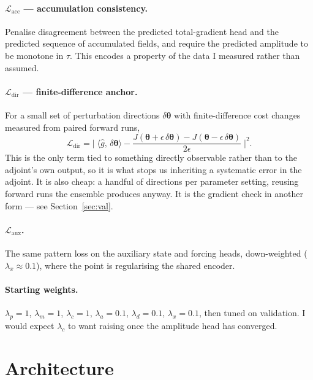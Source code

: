 \paragraph{$\mathcal{L}_{\text{acc}}$ --- accumulation consistency.}
Penalise disagreement between the predicted total-gradient head and the
predicted sequence of accumulated fields, and require the predicted amplitude
to be monotone in $\tau$. This encodes a property of the data I measured rather
than assumed.

\paragraph{$\mathcal{L}_{\text{dir}}$ --- finite-difference anchor.}
For a small set of perturbation directions $\delta\boldsymbol{\theta}$ with
finite-difference cost changes measured from paired forward runs,
\begin{equation}
\mathcal{L}_{\text{dir}}
= \Big|\;\langle \hat{g},\,\delta\boldsymbol{\theta}\rangle
  - \frac{J(\boldsymbol{\theta}+\epsilon\,\delta\boldsymbol{\theta})
        - J(\boldsymbol{\theta}-\epsilon\,\delta\boldsymbol{\theta})}
         {2\epsilon}\;\Big|^{2}.
\end{equation}
This is the only term tied to something directly observable rather than to the
adjoint's own output, so it is what stops us inheriting a systematic error in
the adjoint. It is also cheap: a handful of directions per parameter setting,
reusing forward runs the ensemble produces anyway. It is the gradient check in
another form --- see Section~\ref{sec:val}.

\paragraph{$\mathcal{L}_{\text{aux}}$.} The same pattern loss on the auxiliary
state and forcing heads, down-weighted ($\lambda_{x}\approx0.1$), where the
point is regularising the shared encoder.

\paragraph{Starting weights.}
$\lambda_{p}=1$, $\lambda_{m}=1$, $\lambda_{c}=1$, $\lambda_{a}=0.1$,
$\lambda_{d}=0.1$, $\lambda_{x}=0.1$, then tuned on validation. I would expect
$\lambda_{c}$ to want raising once the amplitude head has converged.

\section{Architecture}

